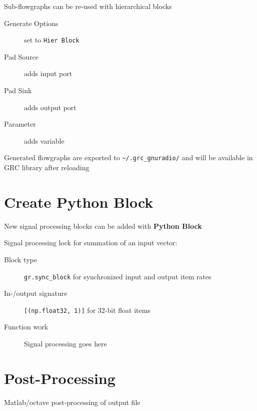 \documentclass[10pt]{article}
\begin{document}
\begin{multicols*}{3}
Sub-flowgraphs can be re-used with hierarchical blocks

\begin{description}
\item[Generate Options] set to \verb|Hier Block|
\item[Pad Source] adds input port
\item[Pad Sink] adds output port
\item[Parameter] adds variable
\end{description}

Generated flowgraphs are exported to \verb|~/.grc_gnuradio/| and will be available in GRC library after reloading


\section*{Create Python Block}

New signal processing blocks can be added with \textbf{Python Block}


Signal processing lock for summation of an input vector:
\begin{description}
\item[Block type] \verb|gr.sync_block| for synchronized input and output item rates

\item[In-/output signature] \verb|[(np.float32, 1)]| for 32-bit float items

\item[Function work] Signal processing goes here
\end{description}

%
%
%

\section*{Post-Processing}
Matlab/octave post-processing of output file



\end{multicols*}
\end{document}
